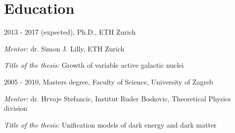 \documentclass[11pt,letterpaper]{article}
\renewenvironment{itemize}{
  \begin{list}{}{
    \setlength{\leftmargin}{1.5em}
    \setlength{\itemsep}{0.15em}
    \setlength{\parskip}{0pt}
    \setlength{\parsep}{0.25em}
  }
}{
  \end{list}
}
\begin{document}
%

%

\section*{Education}

\begin{itemize}
  \item 2013 - 2017 (expected), Ph.D., ETH Zurich
  \begin{itemize}
  \item \textit{Mentor:} dr. Simon J. Lilly, ETH Zurich
\item \textit{Title of the thesis:} Growth of variable active galactic nuclei

\end{itemize}  




  \item 2005 - 2010, Masters degree, Faculty of Science, University of Zagreb
  \begin{itemize}
            \item \textit{Mentor:}
      dr. Hrvoje Stefancic, Institut Ruder Boskovic, Theoretical Physics division
    \item  \textit{Title of the thesis:}
  Unification models of dark energy and dark matter 

\end{itemize}  
\end{itemize}
\end{document}

